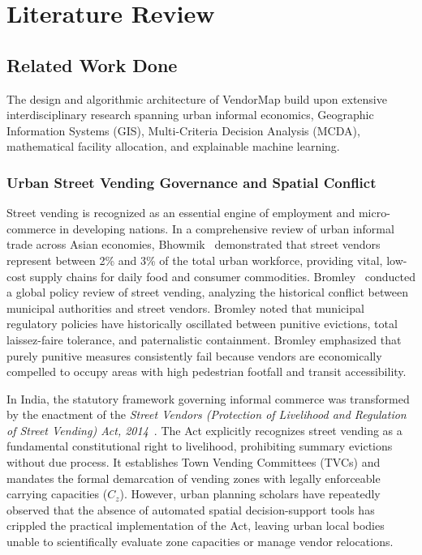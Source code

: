 \chapter{Literature Review}
\label{ch:literature_review}

\section{Related Work Done}
\label{sec:related_work}

The design and algorithmic architecture of VendorMap build upon extensive interdisciplinary research spanning urban informal economics, Geographic Information Systems (GIS), Multi-Criteria Decision Analysis (MCDA), mathematical facility allocation, and explainable machine learning.

\subsection{Urban Street Vending Governance and Spatial Conflict}
Street vending is recognized as an essential engine of employment and micro-commerce in developing nations. In a comprehensive review of urban informal trade across Asian economies, Bhowmik~\cite{bhowmik2005street} demonstrated that street vendors represent between 2\% and 3\% of the total urban workforce, providing vital, low-cost supply chains for daily food and consumer commodities. Bromley~\cite{bromley2000street} conducted a global policy review of street vending, analyzing the historical conflict between municipal authorities and street vendors. Bromley noted that municipal regulatory policies have historically oscillated between punitive evictions, total laissez-faire tolerance, and paternalistic containment. Bromley emphasized that purely punitive measures consistently fail because vendors are economically compelled to occupy areas with high pedestrian footfall and transit accessibility.

In India, the statutory framework governing informal commerce was transformed by the enactment of the \textit{Street Vendors (Protection of Livelihood and Regulation of Street Vending) Act, 2014}~\cite{india2014street}. The Act explicitly recognizes street vending as a fundamental constitutional right to livelihood, prohibiting summary evictions without due process. It establishes Town Vending Committees (TVCs) and mandates the formal demarcation of vending zones with legally enforceable carrying capacities ($C_z$). However, urban planning scholars have repeatedly observed that the absence of automated spatial decision-support tools has crippled the practical implementation of the Act, leaving urban local bodies unable to scientifically evaluate zone capacities or manage vendor relocations.


